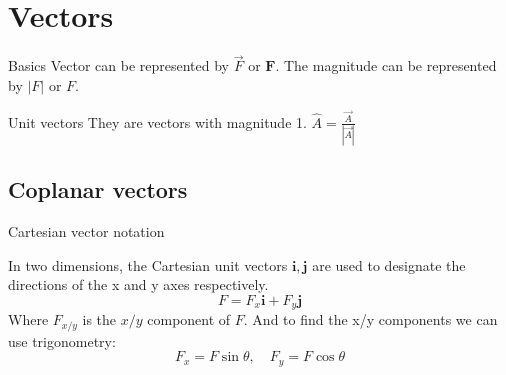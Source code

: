 \documentclass{article}
\begin{document}



\section{Vectors}

\begin{definition}[]{Basics}
  Vector can be represented by $\vec{F}$ or $\boldsymbol{F}$. The magnitude can be represented by $|F|$ or $F$.
\end{definition}








\begin{knBox}[]{Unit vectors}
  They are vectors with magnitude 1. $\hat{A}=\frac{\vec{A}}{|\vec{A}|}$
\end{knBox}

\subsection{Coplanar vectors}
\begin{definition}
  {Cartesian vector notation}

  In two dimensions, the Cartesian unit vectors $\boldsymbol{i}, \boldsymbol{j}$ are used to designate the directions of the x and y axes respectively.
  \[F=F_x \boldsymbol{i} + F_y \boldsymbol{j}\]
  Where $F_{x/y}$ is the $x/y$ component of $F$. And to find the x/y components we can use trigonometry:
  \[F_x=F\sin{\theta},\quad F_y=F\cos{\theta}\]
\end{definition}
\end{document}
